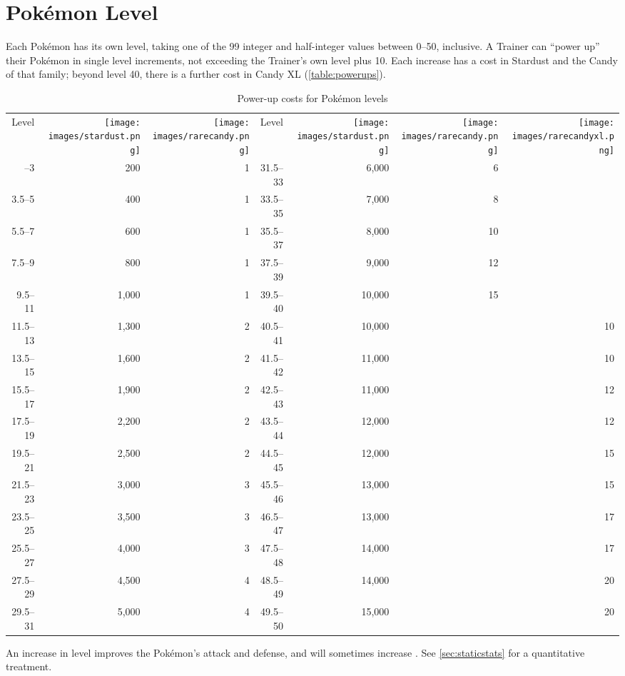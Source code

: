 \section{Pokémon Level\label{sec:plevel}}
Each Pokémon has its own level, taking one of the 99 integer and half-integer
 values between 0--50, inclusive.
A Trainer can ``power up'' their Pokémon in single level increments,
 not exceeding the Trainer's own level plus 10.
Each increase has a cost in Stardust and the Candy of that family; beyond level 40, there
  is a further cost in Candy XL (\autoref{table:powerups}).
\begin{table}
\centering
\begin{tabular}[ht]{rrr|rrrr}
Level &
\texttt{[image: images/stardust.png]} &
\texttt{[image: images/rarecandy.png]} &
Level &
\texttt{[image: images/stardust.png]} &
\texttt{[image: images/rarecandy.png]} &
\texttt{[image: images/rarecandyxl.png]} \\
\Midrule
1.5--3 &   200 & 1 & 31.5--33 &  6,000 &  6 & \\
3.5--5 &   400 & 1 & 33.5--35 &  7,000 &  8 & \\
5.5--7 &   600 & 1 & 35.5--37 &  8,000 & 10 & \\
7.5--9 &   800 & 1 & 37.5--39 &  9,000 & 12 & \\
9.5--11 & 1,000 & 1 & 39.5--40 & 10,000 & 15 & \\
11.5--13 & 1,300 & 2 & 40.5--41 & 10,000 &    & 10 \\
13.5--15 & 1,600 & 2 & 41.5--42 & 11,000 &    & 10 \\
15.5--17 & 1,900 & 2 & 42.5--43 & 11,000 &    & 12 \\
17.5--19 & 2,200 & 2 & 43.5--44 & 12,000 &    & 12 \\
19.5--21 & 2,500 & 2 & 44.5--45 & 12,000 &    & 15 \\
21.5--23 & 3,000 & 3 & 45.5--46 & 13,000 &    & 15 \\
23.5--25 & 3,500 & 3 & 46.5--47 & 13,000 &    & 17 \\
25.5--27 & 4,000 & 3 & 47.5--48 & 14,000 &    & 17 \\ 
27.5--29 & 4,500 & 4 & 48.5--49 & 14,000 &    & 20 \\
29.5--31 & 5,000 & 4 & 49.5--50 & 15,000 &    & 20 \\
\end{tabular}
\caption{Power-up costs for Pokémon levels\label{table:powerups}}
\end{table}
An increase in level improves the Pokémon's attack and defense, and
  will sometimes increase \MHP\@.
See \autoref{sec:staticstats} for a quantitative treatment.

